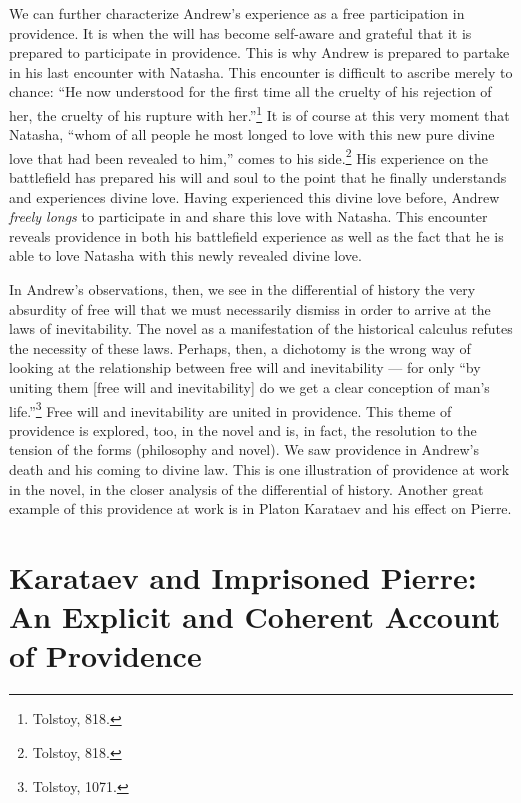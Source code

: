 \documentclass[12pt]{article}
\begin{document}
We can further characterize Andrew's experience as a free participation in providence. It is when the will has become self-aware and grateful that it is prepared to participate in providence. This is why Andrew is prepared to partake in his last encounter with Natasha. This encounter is difficult to ascribe merely to chance: ``He now understood for the first time all the cruelty of his rejection of her, the cruelty of his rupture with her.''\footnote{Tolstoy, 818.} It is of course at this very moment that Natasha, ``whom of all people he most longed to love with this new pure divine love that had been revealed to him,'' comes to his side.\footnote{Tolstoy, 818.} His experience on the battlefield has prepared his will and soul to the point that he finally understands and experiences divine love. Having experienced this divine love before, Andrew \emph{freely longs} to participate in and share this love with Natasha. This encounter reveals providence in both his battlefield experience as well as the fact that he is able to love Natasha with this newly revealed divine love.

In Andrew's observations, then, we see in the differential of history the very absurdity of free will that we must necessarily dismiss in order to arrive at the laws of inevitability. The novel as a manifestation of the historical calculus refutes the necessity of these laws. Perhaps, then, a dichotomy is the wrong way of looking at the relationship between free will and inevitability --- for only ``by uniting them [free will and inevitability] do we get a clear conception of man's life.''\footnote{Tolstoy, 1071.} Free will and inevitability are united in providence. This theme of providence is explored, too, in the novel and is, in fact, the resolution to the tension of the forms (philosophy and novel). We saw providence in Andrew's death and his coming to divine law. This is one illustration of providence at work in the novel, in the closer analysis of the differential of history. Another great example of this providence at work is in Platon Karataev and his effect on Pierre.

\section{Karataev and Imprisoned Pierre: An Explicit and Coherent Account of Providence}
\end{document}
